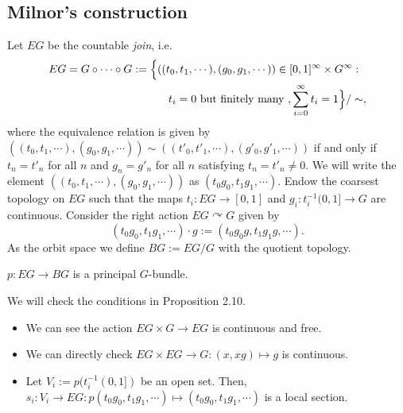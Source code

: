 \documentclass{../../../small}
\begin{document}
\subsection*{Milnor's construction}

Let $EG$ be the countable \emph{join}, i.e.
\begin{align*}
EG=G\circ\cdots\circ G:=\Bigl\{&((t_0,t_1,\cdots),(g_0,g_1,\cdots))\in[0,1]^\infty\times G^\infty:\\
&\quad t_i=0\text{ but finitely many },\sum_{i=0}^\infty t_i=1\Bigr\}/\sim,
\end{align*}
where the equivalence relation is given by $((t_0,t_1,\cdots),(g_0,g_1,\cdots))\sim((t'_0,t'_1,\cdots),(g'_0,g'_1,\cdots))$ if and only if $t_n=t'_n$ for all $n$ and $g_n=g'_n$ for all $n$ satisfying $t_n=t'_n\ne0$.
We will write the element $((t_0,t_1,\cdots),(g_0,g_1,\cdots))$ as $(t_0g_0,t_1g_1,\cdots)$.
Endow the coarsest topology on $EG$ such that the maps $t_i:EG\to[0,1]$ and $g_i:t_i^{-1}(0,1]\to G$ are continuous.
Consider the right action $EG\curvearrowright G$ given by
\[(t_0g_0,t_1g_1,\cdots)\cdot g:=(t_0g_0g,t_1g_1g,\cdots).\]
As the orbit space we define $BG:=EG/G$ with the quotient topology.

\begin{lem*}[3.5]
$p:EG\to BG$ is a principal $G$-bundle.
\end{lem*}
\begin{pf}
We will check the conditions in Proposition 2.10.
\begin{itemize}
\item We can see the action $EG\times G\to EG$ is continuous and free.
\item We can directly check $EG\times EG\to G:(x,xg)\mapsto g$ is continuous.
\item Let $V_i:=p(t_i^{-1}(0,1])$ be an open set. Then, $s_i:V_i\to EG:p(t_0g_0,t_1g_1,\cdots)\mapsto(t_0g_0,t_1g_1,\cdots)$ is a local section.
\end{itemize}
\end{pf}
\end{document}

